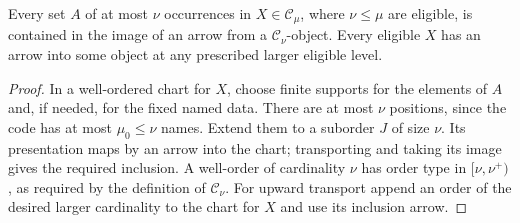 \begin{lemma}\label{lem:la-transport}
Every set $A$ of at most $\nu$ occurrences in $X\in\mathcal C_\mu$,
where $\nu\leq\mu$ are eligible, is contained in the image of an arrow
from a $\mathcal C_\nu$-object. Every eligible $X$ has an arrow into
some object at any prescribed larger eligible level.
\end{lemma}
\begin{proof}
In a well-ordered chart for $X$, choose finite supports for the elements
of $A$ and, if needed, for the fixed named data. There are at most $\nu$
positions, since the code has at most $\mu_0\leq\nu$ names. Extend them
to a suborder $J$ of size $\nu$. Its presentation maps by an arrow into
the chart; transporting and taking its image gives the required
inclusion. A well-order of cardinality $\nu$ has order type in
$[\nu,\nu^+)$, as required by the definition of $\mathcal C_\nu$.
For upward transport append an order of the desired larger cardinality
to the chart for $X$ and use its inclusion arrow.
\end{proof}

